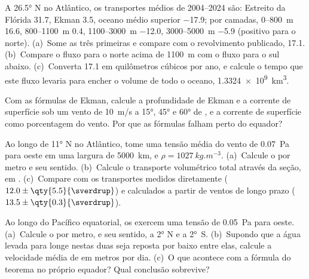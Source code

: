 \begin{exercise}[$\star$]\label{exo:b1:ocean-circulation:3}
A \ang{26.5} N no Atlântico, os transportes médios de 2004--2024 são: Estreito da
Flórida \qty{31.7}{\sverdrup}, Ekman \qty{3.5}{\sverdrup}, oceano médio superior
\qty{-17.9}{\sverdrup}; por camadas, 0--\qty{800}{m} \qty{16.6}{\sverdrup},
800--\qty{1100}{m} \qty{0.4}{\sverdrup}, 1100--\qty{3000}{m} \qty{-12.0}{\sverdrup},
3000--\qty{5000}{m} \qty{-5.9}{\sverdrup} (positivo para o norte). (a)~Some as três
primeiras e compare com o revolvimento publicado, \qty{17.1}{\sverdrup}. (b)~Compare
o fluxo para o norte acima de \qty{1100}{m} com o fluxo para o sul abaixo. (c)~Converta
\qty{17.1}{\sverdrup} em quilômetros cúbicos por ano, e calcule o tempo que este fluxo
levaria para encher o volume de todo o oceano, \qty{1.3324e9}{km^3}.
\end{exercise}

\begin{exercise}[$\star$]\label{exo:b1:ocean-circulation:4}
Com as fórmulas de Ekman, calcule a profundidade de Ekman e a corrente de superfície sob um
vento de \qty{10}{m/s} a \ang{15}, \ang{45} e \ang{60} de , e a
corrente de superfície como porcentagem do vento. Por que as fórmulas falham perto do equador?
\end{exercise}

\begin{exercise}[$\star\star$]\label{exo:b1:ocean-circulation:5}
Ao longo de \ang{11} N no Atlântico, tome uma tensão média do vento de \qty{0.07}{Pa} para
oeste em uma largura de \qty{5000}{km}, e $\rho = \qty{1027}{kg.m^{-3}}$.
(a)~Calcule o  por metro e seu sentido. (b)~Calcule o
transporte volumétrico total através da seção, em . (c)~Compare com os transportes
medidos diretamente ($12.0 \pm \qty{5.5}{\sverdrup}$) e calculados a partir de
ventos de longo prazo ($13.5 \pm \qty{0.3}{\sverdrup}$).
\end{exercise}

\begin{exercise}[$\star\star$]\label{exo:b1:ocean-circulation:6}
Ao longo do Pacífico equatorial, os  exercem uma tensão de \qty{0.05}{Pa}
para oeste. (a)~Calcule o  por metro, e seu sentido, a
\ang{2} N e a \ang{2}~S. (b)~Supondo que a água levada para longe nestas duas
 seja reposta por baixo entre elas, calcule a velocidade média de 
em metros por dia. (c)~O que acontece com a fórmula do teorema no próprio equador?
Qual conclusão sobrevive?
\end{exercise}

